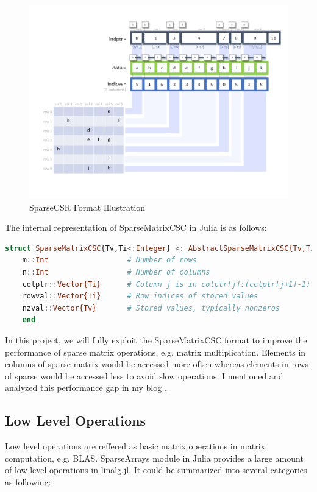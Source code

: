 \begin{figure}
    \begin{center}
        \includegraphics[width = .8\linewidth]{pic/SPCSC.png}
        \caption{SparseCSR Format Illustration}
    \end{center}
\end{figure}

The internal representation of SparseMatrixCSC in Julia is as follows:
\begin{lstlisting}[language=Julia]
    struct SparseMatrixCSC{Tv,Ti<:Integer} <: AbstractSparseMatrixCSC{Tv,Ti}
    m::Int                  # Number of rows
    n::Int                  # Number of columns
    colptr::Vector{Ti}      # Column j is in colptr[j]:(colptr[j+1]-1)
    rowval::Vector{Ti}      # Row indices of stored values
    nzval::Vector{Tv}       # Stored values, typically nonzeros
    end
    \end{lstlisting}

In this project, we will fully exploit the SparseMatrixCSC format to improve the performance of sparse matrix operations, e.g. matrix multiplication. Elements in columns of sparse matrix would be accessed more often whereas elements in rows of sparse would be accessed less to avoid slow operations. I mentioned and analyzed this performance gap in  \href{https://jieli-matrix.github.io/sparsecsc/}{my blog }. 

\subsection{Low Level Operations}

Low level operations are reffered as basic matrix operations in matrix computation, e.g. BLAS. SparseArrays module in Julia provides a large amount of low level operations in \href{https://github.com/JuliaLang/julia/blob/master/stdlib/SparseArrays/src/linalg.jl}{linalg.jl}. It could be summarized into several categories as following:

